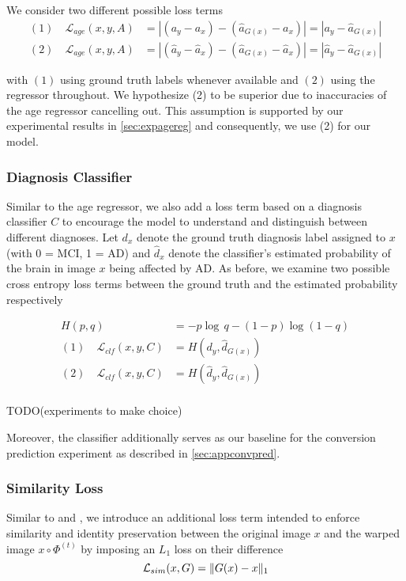 We consider two different possible loss terms 
\begin{equation}
	\begin{split}
		(1) \quad \mathcal{L}_{age}(x, y, A) & = 
		| (a_y - a_x) - (\hat a_{G(x)} - a_x) | =
		| a_y - \hat a_{G(x)} | \\[8pt]
		(2) \quad \mathcal{L}_{age}(x, y, A) & =
		| (\hat a_y - \hat a_x) - (\hat a_{G(x)} - \hat a_x) | = 
		| \hat a_y - \hat a_{G(x)} |
	\end{split}
\end{equation}

with $(1)$ using ground truth labels whenever available and $(2)$ using the regressor throughout. We hypothesize (2) to be superior due to inaccuracies of the age regressor cancelling out. This assumption is supported by our experimental results in \autoref{sec:expagereg} and consequently, we use (2) for our model.

\subsubsection*{Diagnosis Classifier}
Similar to the age regressor, we also add a loss term based on a diagnosis classifier $C$ to encourage the model to understand and distinguish between different diagnoses. Let $d_x$ denote the ground truth diagnosis label assigned to $x$ (with 0 = MCI, 1 = AD) and $\hat d_x$ denote the classifier's estimated probability of the brain in image $x$ being affected by AD. As before, we examine two possible cross entropy loss terms between the ground truth and the estimated probability respectively

\begin{equation}
	\begin{split}
		H(p, q) & = -p \log\, q - (1 - p)\log(1 - q) \\[8pt]
		(1) \quad \mathcal{L}_{clf}(x, y, C) & = 
		H(d_y, \hat d_{G(x)}) \\[8pt]
		(2) \quad \mathcal{L}_{clf}(x, y, C) & =
		H(\hat d_y, \hat d_{G(x)}) \\[8pt]
	\end{split}
\end{equation}

TODO(experiments to make choice)

Moreover, the classifier additionally serves as our baseline for the conversion prediction experiment as described in \autoref{sec:appconvpred}.

\subsubsection*{Similarity Loss}
Similar to \cite{VAGAN} and \cite{wegmayr}, we introduce an additional loss term intended to enforce similarity and identity preservation between the original image $x$ and the warped image $ x \circ \Phi^{(t)} $ by imposing an $L_1$ loss on their difference
\begin{equation}
	\mathcal{L}_{sim}( x, G ) = \lVert G(x) - x \rVert_1
\end{equation}

